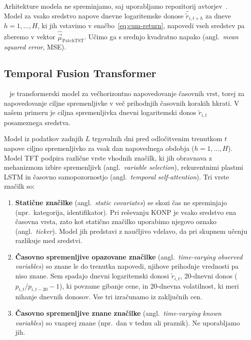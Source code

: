 \documentclass[9pt]{style/friteza}
\begin{document}
Arhitekture modela ne spreminjamo, saj uporabljamo repozitorij avtorjev~\cite{nie2023patchtst_code}. Model za vsako sredstvo napove dnevne logaritemske donose $\hat{\tilde r}_{i,t+h}$ za dneve $h=1,\dots,H$, ki jih vstavimo v enačbo~\eqref{eq:cum-return}, napovedi vseh sredstev pa zberemo v vektor $\hat{\vec{\mu}}_{\mathrm{PatchTST}}$. Učimo ga s srednjo kvadratno napako (angl.\ \emph{mean squared error}, MSE). 


\subsection{Temporal Fusion Transformer}\label{sec:tft}~\cite{lim2021tft} je transformerski model za večhorizontno napovedovanje časovnih vrst, torej za napovedovanje ciljne spremenljivke v več prihodnjih časovnih korakih hkrati. V našem primeru je ciljna spremenljivka dnevni logaritemski donos $\tilde r_{i,t}$ posameznega sredstva.

Model iz podatkov zadnjih $L$ trgovalnih dni pred odločitvenim trenutkom $t$ napove ciljno spremenljivko za vsak dan napovednega obdobja ($h=1,\dots,H$). Model TFT podpira različne vrste vhodnih značilk, ki jih obravnava z mehanizmom izbire spremenljivk (angl.\ \emph{variable selection}), rekurentnimi plastmi LSTM in časovno samopozornostjo (angl.\ \emph{temporal self-attention}). Tri vrste značilk so:

\begin{enumerate}
    \item \textbf{Statične značilke} (angl.\ \emph{static covariates}) se skozi čas ne spreminjajo (npr.\ kategorija, identifikator). Pri reševanju KONP je vsako sredstvo ena časovna vrsta, zato kot statično značilko uporabimo njegovo oznako (angl.\ \emph{ticker}). Model jih predstavi z naučljivo vdelavo, da pri skupnem učenju razlikuje med sredstvi.
    \item \textbf{Časovno spremenljive opazovane značilke} (angl.\ \emph{time-varying observed variables}) so znane le do trenutka napovedi, njihove prihodnje vrednosti pa niso znane. Sem spadajo dnevni logaritemski donosi $\tilde r_{i,t}$, 20-dnevni donos ($p_{i,t}/p_{i,t-20}-1$), ki povzame gibanje cene, in 20-dnevna volatilnost, ki meri nihanje dnevnih donosov. Vse tri izračunamo iz zaključnih cen. 
    \item \textbf{Časovno spremenljive znane značilke} (angl.\ \emph{time-varying known variables}) so vnaprej znane (npr.\ dan v tednu ali praznik). Ne uporabljamo jih.
\end{enumerate}
\end{document}
